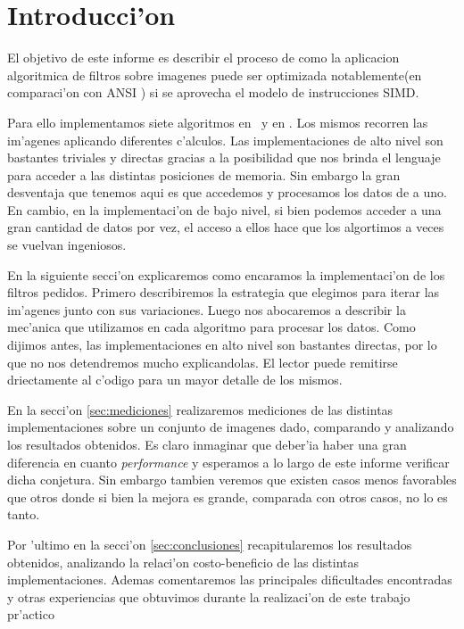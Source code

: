 \section{Introducci'on}

El objetivo de este informe es describir el proceso de como la aplicacion algoritmica de filtros sobre imagenes
puede ser optimizada notablemente(en comparaci'on con ANSI \C) si se aprovecha el modelo de instrucciones SIMD. 

Para ello implementamos siete algoritmos en \C\ y en \ass. Los mismos recorren las im'agenes aplicando diferentes c'alculos. Las implementaciones de alto nivel son bastantes triviales y directas gracias a la posibilidad que nos brinda el lenguaje para acceder a las distintas posiciones de memoria. Sin embargo la gran desventaja que tenemos aqui es que accedemos y procesamos los datos de a uno. En cambio, en la implementaci'on de bajo nivel, si bien podemos acceder a una gran cantidad de datos por vez, el acceso a ellos hace que los algortimos a veces se vuelvan ingeniosos. 

En la siguiente secci'on explicaremos como encaramos la implementaci'on de los filtros pedidos. Primero describiremos la estrategia que elegimos para iterar las im'agenes junto con sus variaciones. Luego nos abocaremos a describir la mec'anica que utilizamos en cada algoritmo para procesar los datos. Como dijimos antes, las implementaciones en alto nivel son bastantes directas, por lo que no nos detendremos mucho explicandolas. El lector puede remitirse driectamente al c'odigo para un mayor detalle de los mismos.

En la secci'on \ref{sec:mediciones} realizaremos mediciones de las distintas implementaciones sobre un conjunto de imagenes dado, comparando y analizando los resultados obtenidos. Es claro inmaginar que deber'ia haber una  gran diferencia en cuanto \textit{performance} y esperamos a lo largo de este informe verificar dicha conjetura. Sin embargo tambien veremos que existen casos menos favorables que otros donde si bien la mejora es grande, comparada con otros casos, no lo es tanto. 

Por 'ultimo en la secci'on \ref{sec:conclusiones} recapitularemos los resultados obtenidos, analizando la relaci'on costo-beneficio de las distintas implementaciones. Ademas comentaremos las principales dificultades encontradas y otras experiencias que obtuvimos durante la realizaci'on de este trabajo pr'actico